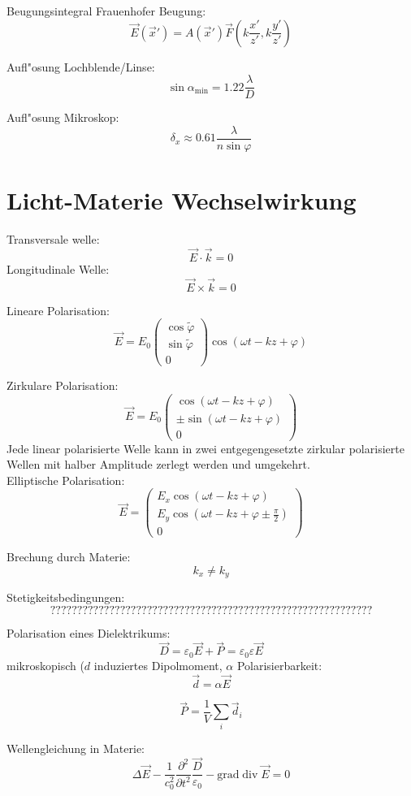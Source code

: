 \documentclass[12pt]{report}
\newcommand{\vepsilon}{\varepsilon}
\newcommand{\vphi}{\varphi}
\begin{document}
Beugungsintegral Frauenhofer Beugung:
\[\vec{E}(\vec{x}')=A(\vec{x}')\vec{F}\left(k\frac{x'}{z'},k\frac{y'}{z'}\right)\]

Aufl"osung Lochblende/Linse:
\[\sin\alpha_\mathrm{min}=1.22\frac{\lambda}{D}\]

Aufl"osung Mikroskop:
\[\delta_x\approx0.61\frac{\lambda}{n\sin\vphi}\]

\section{Licht-Materie Wechselwirkung}


Transversale welle:
\[\vec{E}\cdot\vec{k}=0\]
Longitudinale Welle:
\[\vec{E}\times\vec{k}=0\]

Lineare Polarisation:
\[\vec{E}=E_0\begin{pmatrix}\cos\tilde{\vphi}\\\sin\tilde{\vphi}\\0\end{pmatrix}\cos(\omega t-kz+\vphi)\]

Zirkulare Polarisation:
\[\vec{E}=E_0\begin{pmatrix}\cos(\omega t-kz+\vphi)\\\pm\sin(\omega t-kz+\vphi)\\0\end{pmatrix}\]
Jede linear polarisierte Welle kann in zwei entgegengesetzte zirkular polarisierte Wellen mit halber Amplitude zerlegt werden und umgekehrt.\\

Elliptische Polarisation:
\[\vec{E}=\begin{pmatrix}E_x\cos(\omega t-kz+\vphi)\\E_y\cos(\omega t-kz+\vphi\pm\frac{\pi}{2})\\0\end{pmatrix}\]

Brechung durch Materie:
\[k_x\neq k_y\]

Stetigkeitsbedingungen:
\[????????????????????????????????????????????????????????????\]

Polarisation eines Dielektrikums:
\[\vec{D}=\vepsilon_0\vec{E}+\vec{P}=\vepsilon_0\vepsilon\vec{E}\]
mikroskopisch ($d$ induziertes Dipolmoment, $\alpha$ Polarisierbarkeit:
\[\vec{d}=\alpha\vec{E}\]

\[\vec{P}=\frac{1}{V}\sum_i\vec{d}_i\]

Wellengleichung in Materie:
\[\Delta\vec{E}-\frac{1}{c_0^2}\frac{\partial^2}{\partial t^2}\frac{\vec{D}}{\vepsilon_0}-\mathrm{grad}\mathop\mathrm{div}\vec{E}=0\]
\end{document}
